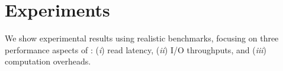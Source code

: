 \section{Experiments}
\label{sec:exp}
We show experimental results using realistic benchmarks,
focusing on three performance aspects of \ours{}:
(\textit{i}) read latency, (\textit{ii}) I/O throughputs,
and (\textit{iii}) computation overheads.

